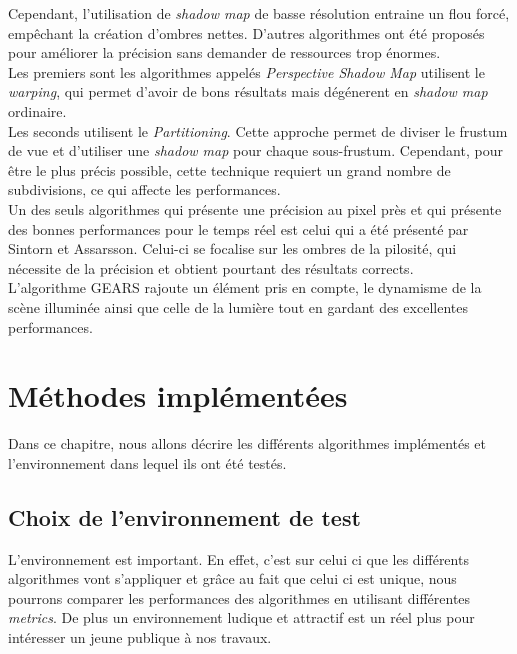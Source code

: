 \documentclass[a4paper,12pt]{report}
\begin{document}
Cependant, l'utilisation de \textit{shadow map} de basse résolution entraine un flou forcé, empêchant la création d'ombres nettes. D'autres algorithmes ont été proposés pour améliorer la précision sans demander de ressources trop énormes. 
\\

Les premiers sont les algorithmes appelés \textit{Perspective Shadow Map}\cite{wimmer2004light,stamminger2002perspective,lloyd2008logarithmic} utilisent le \textit{warping}, qui permet d'avoir de bons résultats mais dégénerent en \textit{shadow map} ordinaire.
\\

Les seconds utilisent le \textit{Partitioning}. Cette approche permet de diviser le frustum de vue et d'utiliser une \textit{shadow map} pour chaque sous-frustum. Cependant, pour être le plus précis possible, cette technique requiert un grand nombre de subdivisions, ce qui affecte les performances.
\\

Un des seuls algorithmes qui présente une précision au pixel près et qui présente des bonnes performances pour le temps réel est celui qui a été présenté par Sintorn et Assarsson\cite{sintorn2009hair}. Celui-ci se focalise sur les ombres de la pilosité, qui nécessite de la précision et obtient pourtant des résultats corrects.
\\

L'algorithme GEARS\cite{wang2014gears} rajoute un élément pris en compte, le dynamisme de la scène illuminée ainsi que celle de la lumière tout en gardant des excellentes performances.


\chapter{Méthodes implémentées}

Dans ce chapitre, nous allons décrire les différents algorithmes implémentés et l'environnement dans lequel ils ont été testés.

\section{Choix de l'environnement de test}

L'environnement est important. En effet, c'est sur celui ci que les différents algorithmes vont s'appliquer et grâce au fait que celui ci est unique, nous pourrons comparer les performances des algorithmes en utilisant différentes \textit{metrics}. De plus un environnement ludique et attractif est un réel plus pour intéresser un jeune publique à nos travaux.
\end{document}
